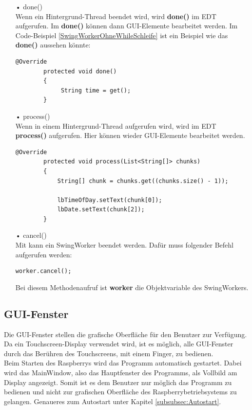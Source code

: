\begin{itemize}
\item[•] done()
\\ Wenn ein Hintergrund-Thread beendet wird, wird \textbf{done()} im \ac{EDT} aufgerufen. Im \textbf{done()} können dann \ac{GUI}-Elemente bearbeitet werden. Im Code-Beispiel \ref{SwingWorkerOhneWhileSchleife} ist ein Beispiel wie das \textbf{done()} aussehen könnte:
\begin{lstlisting}[style=JavaStyle, caption=SwingWorker done()]
        @Override
        protected void done()
        {
             String time = get();
        }
\end{lstlisting}
\item[•] process()
\\ Wenn in einem Hintergrund-Thread  aufgerufen wird, wird im \ac{EDT} \textbf{process()} aufgerufen. Hier können wieder \ac{GUI}-Elemente bearbeitet werden.
\begin{lstlisting}[style=JavaStyle, caption=SwingWorker process()]
        @Override
        protected void process(List<String[]> chunks)
        {
            String[] chunk = chunks.get((chunks.size() - 1));
            
            lbTimeOfDay.setText(chunk[0]);
            lbDate.setText(chunk[2]);
        }
\end{lstlisting}

\newpage

\item[•] cancel()
\\ Mit  kann ein SwingWorker beendet werden. Dafür muss folgender Befehl aufgerufen werden:
\begin{lstlisting}[style=JavaStyle, caption=SwingWorker abbrechen]
	    worker.cancel();
\end{lstlisting}
Bei diesem Methodenaufruf ist \textbf{worker} die Objektvariable des SwingWorkers.
\end{itemize}

\subsection{GUI-Fenster}
Die \ac{GUI}-Fenster stellen die grafische Oberfläche für den Benutzer zur Verfügung. Da ein Touchscreen-Display verwendet wird, ist es möglich, alle \ac{GUI}-Fenster durch das Berühren des Touchscreens, mit einem Finger, zu bedienen. 
\\ Beim Starten des Raspberrys wird das Programm automatisch gestartet. Dabei wird das MainWindow, also das Hauptfenster des Programms, als Vollbild am Display angezeigt. Somit ist es dem Benutzer nur möglich das Programm zu bedienen und nicht zur grafischen Oberfläche des Raspberrybetriebsystems zu gelangen. Genaueres zum Autostart unter Kapitel \ref{subsubsec:Autostart}.


